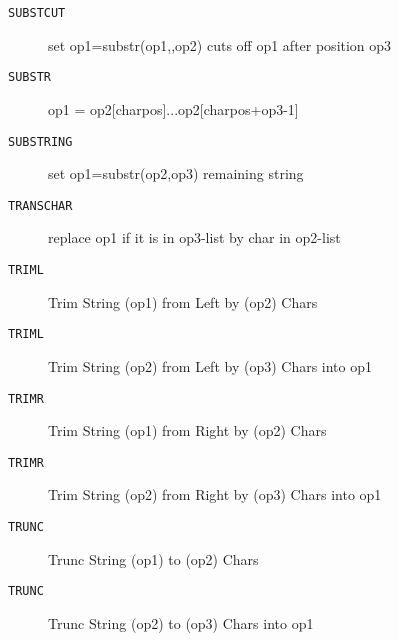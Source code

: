 \begin{description}
\item[\texttt{SUBSTCUT}]  set op1=substr(op1,,op2) cuts off op1 after position op3\\

\end{description}
\begin{description}
\item[\texttt{SUBSTR}]  op1 = op2[charpos]...op2[charpos+op3-1]\\

\end{description}
\begin{description}
\item[\texttt{SUBSTRING}]  set op1=substr(op2,op3) remaining string\\

\end{description}
\begin{description}
\item[\texttt{TRANSCHAR}]  replace op1 if it is in op3-list by char in op2-list\\

\end{description}
\begin{description}
\item[\texttt{TRIML}]  Trim String (op1) from Left by (op2) Chars\\

\end{description}
\begin{description}
\item[\texttt{TRIML}]  Trim String (op2) from Left by (op3) Chars into op1\\

\end{description}
\begin{description}
\item[\texttt{TRIMR}]  Trim String (op1) from Right by (op2) Chars\\

\end{description}
\begin{description}
\item[\texttt{TRIMR}]  Trim String (op2) from Right by (op3) Chars into op1\\

\end{description}
\begin{description}
\item[\texttt{TRUNC}]  Trunc String (op1) to (op2) Chars\\

\end{description}
\begin{description}
\item[\texttt{TRUNC}]  Trunc String (op2) to (op3) Chars into op1\\

\end{description}
